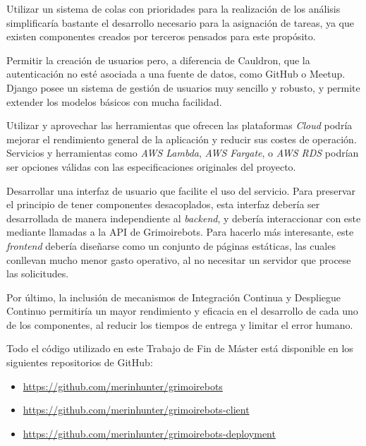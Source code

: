 Utilizar un sistema de colas con prioridades para la realización de los análisis simplificaría bastante el desarrollo necesario para la asignación de tareas, ya que existen componentes creados por terceros pensados para este propósito.

Permitir la creación de usuarios pero, a diferencia de Cauldron, que la autenticación no esté asociada a una fuente de datos, como GitHub o Meetup. Django posee un sistema de gestión de usuarios muy sencillo y robusto, y permite extender los modelos básicos con mucha facilidad.

Utilizar y aprovechar las herramientas que ofrecen las plataformas \emph{Cloud} podría mejorar el rendimiento general de la aplicación y reducir sus costes de operación. Servicios y herramientas como \emph{AWS Lambda}, \emph{AWS Fargate}, o \emph{AWS RDS} podrían ser opciones válidas con las especificaciones originales del proyecto.

Desarrollar una interfaz de usuario que facilite el uso del servicio. Para preservar el principio de tener componentes desacoplados, esta interfaz debería ser desarrollada de manera independiente al \emph{backend}, y debería interaccionar con este mediante llamadas a la API\index{} de Grimoirebots. Para hacerlo más interesante, este \emph{frontend} debería diseñarse como un conjunto de páginas estáticas, las cuales conllevan mucho menor gasto operativo, al no necesitar un servidor que procese las solicitudes.

Por último, la inclusión de mecanismos de Integración Continua y Despliegue Continuo permitiría un mayor rendimiento y eficacia en el desarrollo de cada uno de los componentes, al reducir los tiempos de entrega y limitar el error humano.

Todo el código utilizado en este Trabajo de Fin de Máster está disponible en los siguientes repositorios de GitHub:

\begin{itemize}
    \item \url{https://github.com/merinhunter/grimoirebots}
    \item \url{https://github.com/merinhunter/grimoirebots-client}
    \item \url{https://github.com/merinhunter/grimoirebots-deployment}
\end{itemize}
